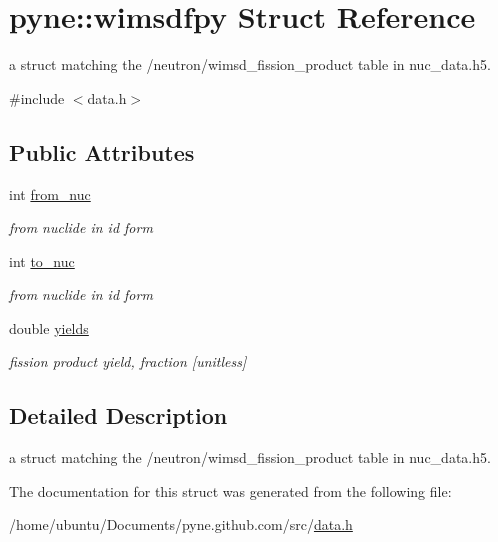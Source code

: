 \hypertarget{structpyne_1_1wimsdfpy}{}\section{pyne\+:\+:wimsdfpy Struct Reference}
\label{structpyne_1_1wimsdfpy}


a struct matching the \textquotesingle{}/neutron/wimsd\+\_\+fission\+\_\+product\textquotesingle{} table in nuc\+\_\+data.\+h5.  




{\ttfamily \#include $<$data.\+h$>$}

\subsection*{Public Attributes}
\begin{DoxyCompactItemize}
\item 
int \hyperlink{structpyne_1_1wimsdfpy_a7521e458719ebb8ed23f4912ec4555f8}{from\+\_\+nuc}\hypertarget{structpyne_1_1wimsdfpy_a7521e458719ebb8ed23f4912ec4555f8}{}\label{structpyne_1_1wimsdfpy_a7521e458719ebb8ed23f4912ec4555f8}

\begin{DoxyCompactList}\small\item\em from nuclide in id form \end{DoxyCompactList}\item 
int \hyperlink{structpyne_1_1wimsdfpy_a2a0f913a64fb76c5c82e1212df7fbb6c}{to\+\_\+nuc}\hypertarget{structpyne_1_1wimsdfpy_a2a0f913a64fb76c5c82e1212df7fbb6c}{}\label{structpyne_1_1wimsdfpy_a2a0f913a64fb76c5c82e1212df7fbb6c}

\begin{DoxyCompactList}\small\item\em from nuclide in id form \end{DoxyCompactList}\item 
double \hyperlink{structpyne_1_1wimsdfpy_a1c20eef7a02f2f62dba113cbf24d8bf2}{yields}\hypertarget{structpyne_1_1wimsdfpy_a1c20eef7a02f2f62dba113cbf24d8bf2}{}\label{structpyne_1_1wimsdfpy_a1c20eef7a02f2f62dba113cbf24d8bf2}

\begin{DoxyCompactList}\small\item\em fission product yield, fraction \mbox{[}unitless\mbox{]} \end{DoxyCompactList}\end{DoxyCompactItemize}


\subsection{Detailed Description}
a struct matching the \textquotesingle{}/neutron/wimsd\+\_\+fission\+\_\+product\textquotesingle{} table in nuc\+\_\+data.\+h5. 

The documentation for this struct was generated from the following file\+:\begin{DoxyCompactItemize}
\item 
/home/ubuntu/\+Documents/pyne.\+github.\+com/src/\hyperlink{data_8h}{data.\+h}\end{DoxyCompactItemize}
